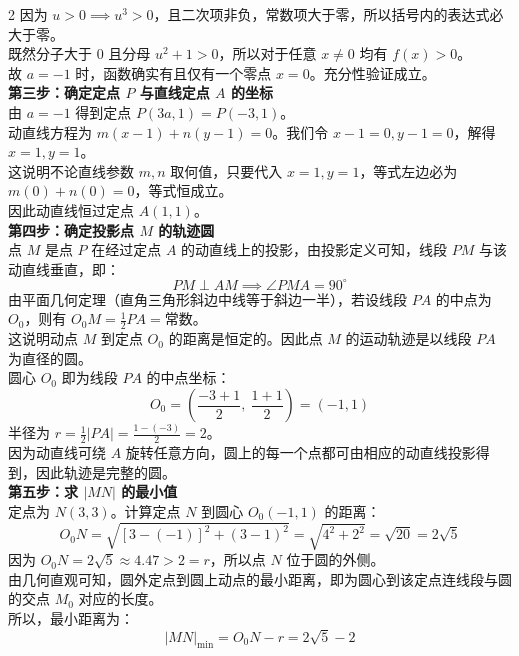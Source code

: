 \documentclass[11pt,a4paper]{ctexart}
\begin{document}
\begin{paracol}{2}
{  因为 $u > 0 \implies u^3 > 0$，且二次项非负，常数项大于零，所以括号内的表达式必大于零。\\
  既然分子大于 $0$ 且分母 $u^2+1 > 0$，所以对于任意 $x \ne 0$ 均有 $f(x) > 0$。\\
  故 $a = -1$ 时，函数确实有且仅有一个零点 $x = 0$。充分性验证成立。\\[0.3em]
  \textbf{第三步：确定定点 $P$ 与直线定点 $A$ 的坐标}\\
  由 $a = -1$ 得到定点 $P(3a, 1) = P(-3, 1)$。\\
  动直线方程为 $m(x-1) + n(y-1) = 0$。我们令 $x-1=0, y-1=0$，解得 $x=1, y=1$。\\
  这说明不论直线参数 $m,n$ 取何值，只要代入 $x=1, y=1$，等式左边必为 $m(0) + n(0) = 0$，等式恒成立。\\
  因此动直线恒过定点 $A(1,1)$。\\[0.3em]
  \textbf{第四步：确定投影点 $M$ 的轨迹圆}\\
  点 $M$ 是点 $P$ 在经过定点 $A$ 的动直线上的投影，由投影定义可知，线段 $PM$ 与该动直线垂直，即：
  $$PM \perp AM \implies \angle PMA = 90^\circ$$
  由平面几何定理（直角三角形斜边中线等于斜边一半），若设线段 $PA$ 的中点为 $O_0$，则有 $O_0M = \frac{1}{2}PA = \text{常数}$。\\
  这说明动点 $M$ 到定点 $O_0$ 的距离是恒定的。因此点 $M$ 的运动轨迹是以线段 $PA$ 为直径的圆。\\
  圆心 $O_0$ 即为线段 $PA$ 的中点坐标：
  $$O_0 = \left(\frac{-3+1}{2},\ \frac{1+1}{2}\right) = (-1, 1)$$
  半径为 $r = \frac{1}{2}|PA| = \frac{1 - (-3)}{2} = 2$。\\
  因为动直线可绕 $A$ 旋转任意方向，圆上的每一个点都可由相应的动直线投影得到，因此轨迹是完整的圆。\\[0.3em]
  \textbf{第五步：求 $|MN|$ 的最小值}\\
  定点为 $N(3,3)$。计算定点 $N$ 到圆心 $O_0(-1,1)$ 的距离：
  $$O_0N = \sqrt{[3 - (-1)]^2 + (3 - 1)^2} = \sqrt{4^2 + 2^2} = \sqrt{20} = 2\sqrt{5}$$
  因为 $O_0N = 2\sqrt{5} \approx 4.47 > 2 = r$，所以点 $N$ 位于圆的外侧。\\
  由几何直观可知，圆外定点到圆上动点的最小距离，即为圆心到该定点连线段与圆的交点 $M_0$ 对应的长度。\\
  所以，最小距离为：
  $$|MN|_{\min} = O_0N - r = 2\sqrt{5} - 2$$
}
\switchcolumn
{}
\end{paracol}
\end{document}
